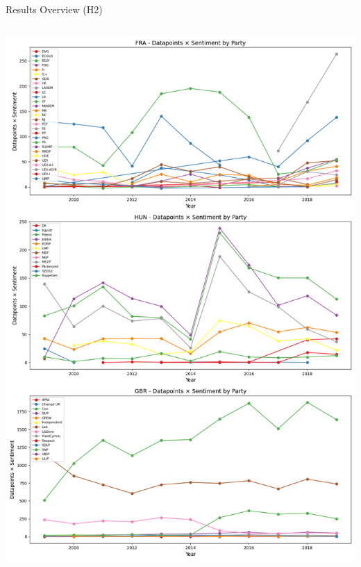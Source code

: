 \documentclass[8pt]{beamer}
\begin{document}
\begin{frame}{Results Overview (H2)}
\begin{columns}[T]
\begin{column}{0.5\textwidth}
                \includegraphics[width=\textwidth]{img/datapoints_times_sentiment_3_rows.png}
                
            \end{column}
        \end{columns}
\end{frame}
\end{document}
